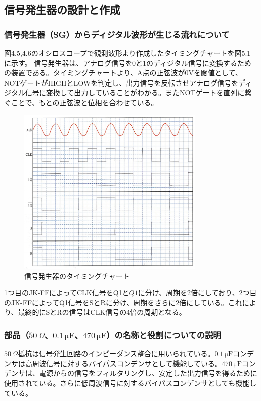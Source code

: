 \documentclass{jlreq}
\numberwithin{equation}{section}
\begin{document}
\subsection{信号発生器の設計と作成}
\subsubsection{信号発生器（SG）からディジタル波形が生じる流れについて}
図4.5,4.6のオシロスコープで観測波形より作成したタイミングチャートを図5.1に示す。
信号発生器は、アナログ信号を0と1のディジタル信号に変換するための装置である。タイミングチャートより、A点の正弦波が0Vを閾値として、NOTゲートがHIGHとLOWを判定し、出力信号を反転させアナログ信号をディジタル信号に変換して出力していることがわかる。またNOTゲートを直列に繋ぐことで、もとの正弦波と位相を合わせている。\\

\begin{figure}[H]
  \centering
  \includegraphics[width=0.8\textwidth]{assets/sgchart.png}
  \caption{信号発生器のタイミングチャート}
\end{figure}

1つ目のJK-FFによってCLK信号をQ1と\(\overline{Q1}\)に分け、周期を2倍にしており、2つ目のJK-FFによってQ1信号をSとRに分け、周期をさらに2倍にしている。これにより、最終的にSとRの信号はCLK信号の4倍の周期となる。

\subsubsection{部品（$50\,\Omega$、$0.1\,\mathrm{\mu F}$、$470\,\mathrm{\mu F}$）の名称と役割についての説明}
$50\,\Omega$抵抗は信号発生回路のインピーダンス整合に用いられている。$0.1\,\mathrm{\mu F}$コンデンサは高周波信号に対するバイパスコンデンサとして機能している。$470\,\mathrm{\mu F}$コンデンサは、電源からの信号をフィルタリングし、安定した出力信号を得るために使用されている。さらに低周波信号に対するバイパスコンデンサとしても機能している。
\end{document}

